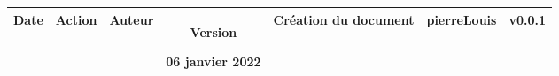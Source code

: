 \thispagestyle{empty}

\begin{table}[ht]
    \centering
    \begin{xltabular}{\linewidth}{| c
        | >{\centering\arraybackslash}X
        | >{\centering\arraybackslash}p{2.1cm}
        | c|}

        \hline
          Date & Action                 & Auteur               & Version
        \endfirsthead
        \hline

        06 janvier 2022                 & Création du document   & \gls{pierreLouis}    & v0.0.1  \\\hline

    \end{xltabular}
    \label{tab:versionning}
\end{table}
